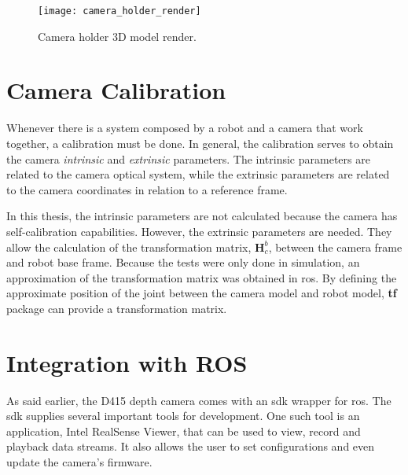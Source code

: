 \begin{figure}[htbp]
	\centering
	\texttt{[image: camera\_holder\_render]}
	\caption[Camera holder 3D model render.]{Camera holder 3D model render.}
	\label{fig:camera_holder_render}
\end{figure}



\section{Camera Calibration}
\label{sec:vision_system_camera_calibration}

Whenever there is a system composed by a robot and a camera that work together, a calibration must be done. In general, the calibration serves to obtain the camera \textit{intrinsic} and \textit{extrinsic} parameters. The intrinsic parameters are related to the camera optical system, while the extrinsic parameters are related to the camera coordinates in relation to a reference frame.

In this thesis, the intrinsic parameters are not calculated because the camera has self-calibration capabilities. However, the extrinsic parameters are needed. They allow the calculation of the transformation matrix, $\boldsymbol{H}^b_c$, between the camera frame and robot base frame. Because the tests were only done in simulation, an approximation of the transformation matrix was obtained in \gls{ros}. By defining the approximate position of the joint between the camera model and robot model, \textbf{tf} package can provide a transformation matrix.



\section{Integration with ROS}
\label{sec:vision_system_integration_ros}

As said earlier, the D415 depth camera comes with an \gls{sdk} wrapper for \gls{ros}. The \gls{sdk} supplies several important tools for development. One such tool is an application, Intel\textregistered{} RealSense\texttrademark{} Viewer, that can be used to view, record and playback data streams. It also allows the user to set configurations and even update the camera's firmware.

